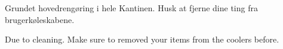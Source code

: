 \documentclass{article}
\begin{document}
\maketitle

\null
\vspace{-1cm}


\huge

\begin{center}

\vspace{-0.8cm}

Grundet hovedrengøring i hele Kantinen. Husk at fjerne dine ting fra
brugerkøleskabene.

\english


Due to cleaning. Make sure to removed your items from the coolers before.

\english

\vspace{-1cm}

\end{center}

\dansk

\underskriv
\end{document}
